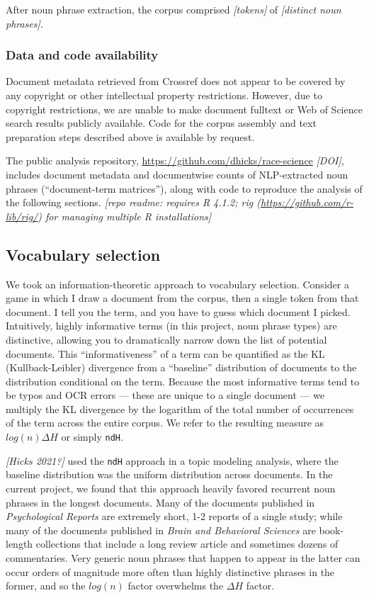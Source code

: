 \documentclass[12pt]{article}
\begin{document}
After noun phrase extraction, the corpus comprised \emph{{[}tokens{]}} of \emph{{[}distinct noun phrases{]}}.

\hypertarget{data-and-code-availability}{%
\subsubsection*{Data and code availability}\label{data-and-code-availability}}

Document metadata retrieved from Crossref does not appear to be covered by any copyright or other intellectual property restrictions. However, due to copyright restrictions, we are unable to make document fulltext or Web of Science search results publicly available. Code for the corpus assembly and text preparation steps described above is available by request.

The public analysis repository, \url{https://github.com/dhicks/race-science} \emph{{[}DOI{]}}, includes document metadata and documentwise counts of NLP-extracted noun phrases (``document-term matrices''), along with code to reproduce the analysis of the following sections. \emph{{[}repo readme: requires R 4.1.2; rig (\url{https://github.com/r-lib/rig/}) for managing multiple R installations{]}}

\hypertarget{vocabulary-selection}{%
\subsection*{Vocabulary selection}\label{vocabulary-selection}}

We took an information-theoretic approach to vocabulary selection. Consider a game in which I draw a document from the corpus, then a single token from that document. I tell you the term, and you have to guess which document I picked. Intuitively, highly informative terms (in this project, noun phrase types) are distinctive, allowing you to dramatically narrow down the list of potential documents. This ``informativeness'' of a term can be quantified as the KL (Kullback-Leibler) divergence from a ``baseline'' distribution of documents to the distribution conditional on the term. Because the most informative terms tend to be typos and OCR errors --- these are unique to a single document --- we multiply the KL divergence by the logarithm of the total number of occurrences of the term across the entire corpus. We refer to the resulting measure as \(log(n) \Delta H\) or simply \texttt{ndH}.

\emph{{[}Hicks 2021?{]}} used the \texttt{ndH} approach in a topic modeling analysis, where the baseline distribution was the uniform distribution across documents. In the current project, we found that this approach heavily favored recurrent noun phrases in the longest documents. Many of the documents published in \emph{Psychological Reports} are extremely short, 1-2 reports of a single study; while many of the documents published in \emph{Brain and Behavioral Sciences} are book-length collections that include a long review article and sometimes dozens of commentaries. Very generic noun phrases that happen to appear in the latter can occur orders of magnitude more often than highly distinctive phrases in the former, and so the \(log(n)\) factor overwhelms the \(\Delta H\) factor.
\end{document}
